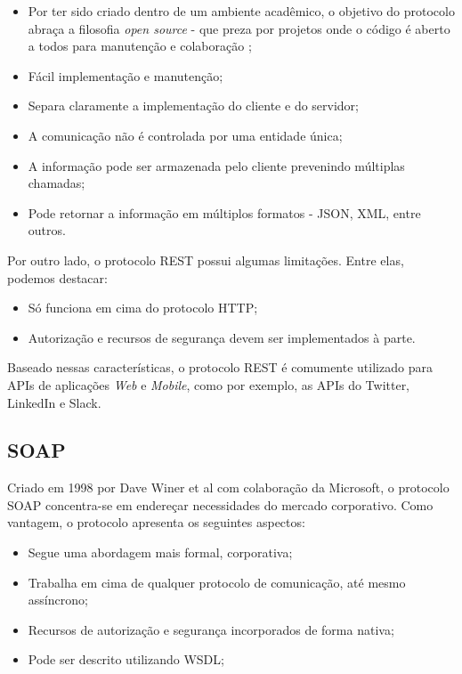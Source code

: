 \begin{itemize}
\item Por ter sido criado dentro de um ambiente acadêmico, o objetivo do protocolo abraça a filosofia \textit{open source} - que preza por projetos onde o código é aberto a todos para manutenção e colaboração \cite{weber2004success};
\item Fácil implementação e manutenção;
\item Separa claramente a implementação do cliente e do servidor;
\item A comunicação não é controlada por uma entidade única;
\item A informação pode ser armazenada pelo cliente prevenindo múltiplas chamadas;
\item Pode retornar a informação em múltiplos formatos - JSON, XML, entre outros.
\end{itemize}

Por outro lado, o protocolo REST possui algumas limitações. Entre elas, podemos destacar:

\begin{itemize}
	\item Só funciona em cima do protocolo HTTP;
	\item Autorização e recursos de segurança devem ser implementados à parte.
\end{itemize}

Baseado nessas características, o protocolo REST é comumente utilizado para APIs de aplicações \textit{Web} e \textit{Mobile}, como por exemplo, as APIs do Twitter, LinkedIn e Slack.

\subsection{SOAP}
Criado em 1998 por Dave Winer et al com colaboração da Microsoft, o protocolo SOAP concentra-se em endereçar necessidades do mercado corporativo. Como vantagem, o protocolo apresenta os seguintes aspectos:

\begin{itemize}
	\item Segue uma abordagem mais formal, corporativa;
	\item Trabalha em cima de qualquer protocolo de comunicação, até mesmo assíncrono;
	\item Recursos de autorização e segurança incorporados de forma nativa;
	\item Pode ser descrito utilizando WSDL;
\end{itemize}

